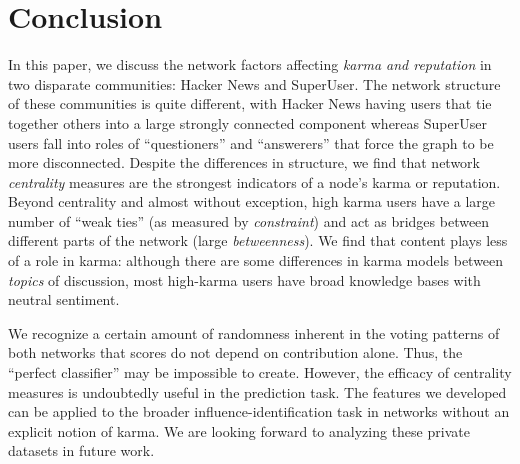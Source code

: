 \documentclass[11pt]{article}
\begin{document}
\section{Conclusion}
\label{sec:conclusion}

In this paper, we discuss the network factors affecting \textit{karma and reputation}
in two disparate communities: Hacker News and
SuperUser. The network structure of these communities is quite different, with
Hacker News having users that tie together others into a large strongly
connected component whereas SuperUser users fall into roles of ``questioners''
and ``answerers'' that force the graph to be more disconnected. Despite the
differences in structure, we find that network \textit{centrality} measures are
the strongest indicators of a node's karma or reputation. Beyond centrality and
almost without exception, high karma users have a large number of ``weak ties''
(as measured by \textit{constraint}) and act as bridges between different parts
of the network (large \textit{betweenness}). We find that content plays less of a role
in karma: although there are some differences in karma models
between \textit{topics} of discussion, most high-karma users have broad
knowledge bases with neutral sentiment. 

We recognize a certain amount of randomness inherent in the voting patterns 
of both networks that scores do not depend on contribution alone. Thus, 
the ``perfect classifier'' may be  impossible to create. However, the efficacy 
of centrality measures  is undoubtedly useful in the prediction task. 
The features we developed can be applied to the broader influence-identification 
task in networks without an explicit notion of karma. We are looking forward
to analyzing these private datasets in future work.

{} 
\end{document}
